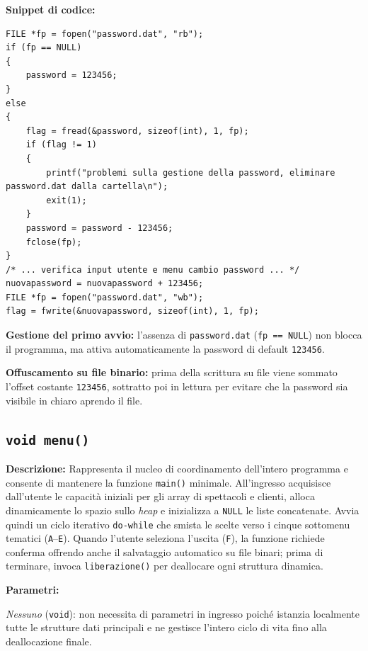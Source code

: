 \documentclass[11pt,a4paper,oneside,openany]{book}
\newenvironment{listacomp}{%
    \small
    \begin{list}{\textendash}{%
        \setlength{\topsep}{2pt}%
        \setlength{\partopsep}{0pt}%
        \setlength{\itemsep}{1pt}%
        \setlength{\parsep}{0pt}%
        \setlength{\leftmargin}{1.2em}%
    }%
}{%
    \end{list}%
}
\begin{document}
\begin{samepage}
\noindent\textbf{Snippet di codice:}
\begin{lstlisting}[caption={Autenticazione iniziale e codifica password in avvio()}]
FILE *fp = fopen("password.dat", "rb");
if (fp == NULL)
{
    password = 123456;
}
else
{
    flag = fread(&password, sizeof(int), 1, fp);
    if (flag != 1)
    {
        printf("problemi sulla gestione della password, eliminare password.dat dalla cartella\n");
        exit(1);
    }
    password = password - 123456;
    fclose(fp);
}
/* ... verifica input utente e menu cambio password ... */
nuovapassword = nuovapassword + 123456;
FILE *fp = fopen("password.dat", "wb");
flag = fwrite(&nuovapassword, sizeof(int), 1, fp);
\end{lstlisting}

\begin{listacomp}
    \item \textbf{Gestione del primo avvio:} l'assenza di \texttt{password.dat} (\texttt{fp == NULL}) non blocca il programma, ma attiva automaticamente la password di default \texttt{123456}.
    \item \textbf{Offuscamento su file binario:} prima della scrittura su file viene sommato l'offset costante \texttt{123456}, sottratto poi in lettura per evitare che la password sia visibile in chiaro aprendo il file.
\end{listacomp}
\end{samepage}

\subsection[menu()]{\texttt{void menu()}}\label{sec:menu}

\noindent\textbf{Descrizione:}
Rappresenta il nucleo di coordinamento dell'intero programma e consente di mantenere la funzione \texttt{main()} minimale. All'ingresso acquisisce dall'utente le capacità iniziali per gli array di spettacoli e clienti, alloca dinamicamente lo spazio sullo \emph{heap} e inizializza a \texttt{NULL} le liste concatenate. Avvia quindi un ciclo iterativo \texttt{do-while} che smista le scelte verso i cinque sottomenu tematici (\texttt{A}--\texttt{E}). Quando l'utente seleziona l'uscita (\texttt{F}), la funzione richiede conferma offrendo anche il salvataggio automatico su file binari; prima di terminare, invoca \texttt{liberazione()} per deallocare ogni struttura dinamica.

\noindent\textbf{Parametri:}
\begin{listacomp}
    \item \textit{Nessuno} (\texttt{void}): non necessita di parametri in ingresso poiché istanzia localmente tutte le strutture dati principali e ne gestisce l'intero ciclo di vita fino alla deallocazione finale.
\end{listacomp}
\end{document}
